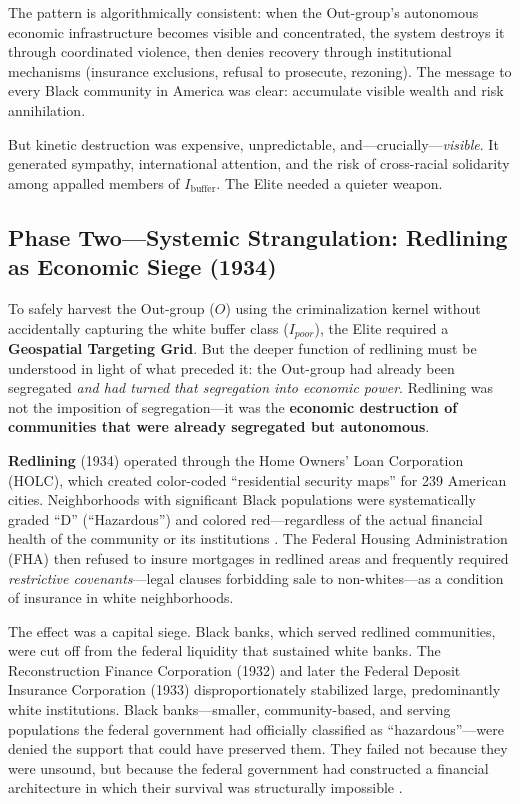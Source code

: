 \documentclass[12pt,openany]{book}
\begin{document}
The pattern is algorithmically consistent: when the Out-group's autonomous economic infrastructure becomes visible and concentrated, the system destroys it through coordinated violence, then denies recovery through institutional mechanisms (insurance exclusions, refusal to prosecute, rezoning). The message to every Black community in America was clear: accumulate visible wealth and risk annihilation.

But kinetic destruction was expensive, unpredictable, and---crucially---\textit{visible}. It generated sympathy, international attention, and the risk of cross-racial solidarity among appalled members of $I_{\text{buffer}}$. The Elite needed a quieter weapon.

\subsection{Phase Two---Systemic Strangulation: Redlining as Economic Siege (1934)}

To safely harvest the Out-group ($O$) using the criminalization kernel without accidentally capturing the white buffer class ($I_{poor}$), the Elite required a \textbf{Geospatial Targeting Grid}. But the deeper function of redlining must be understood in light of what preceded it: the Out-group had already been segregated \textit{and had turned that segregation into economic power}. Redlining was not the imposition of segregation---it was the \textbf{economic destruction of communities that were already segregated but autonomous}.

\textbf{Redlining} (1934) operated through the Home Owners' Loan Corporation (HOLC), which created color-coded ``residential security maps'' for 239 American cities. Neighborhoods with significant Black populations were systematically graded ``D'' (``Hazardous'') and colored red---regardless of the actual financial health of the community or its institutions \cite{rothstein, coatesreparations}. The Federal Housing Administration (FHA) then refused to insure mortgages in redlined areas and frequently required \textit{restrictive covenants}---legal clauses forbidding sale to non-whites---as a condition of insurance in white neighborhoods.

The effect was a capital siege. Black banks, which served redlined communities, were cut off from the federal liquidity that sustained white banks. The Reconstruction Finance Corporation (1932) and later the Federal Deposit Insurance Corporation (1933) disproportionately stabilized large, predominantly white institutions. Black banks---smaller, community-based, and serving populations the federal government had officially classified as ``hazardous''---were denied the support that could have preserved them. They failed not because they were unsound, but because the federal government had constructed a financial architecture in which their survival was structurally impossible \cite{baradaran_color}.
\end{document}
